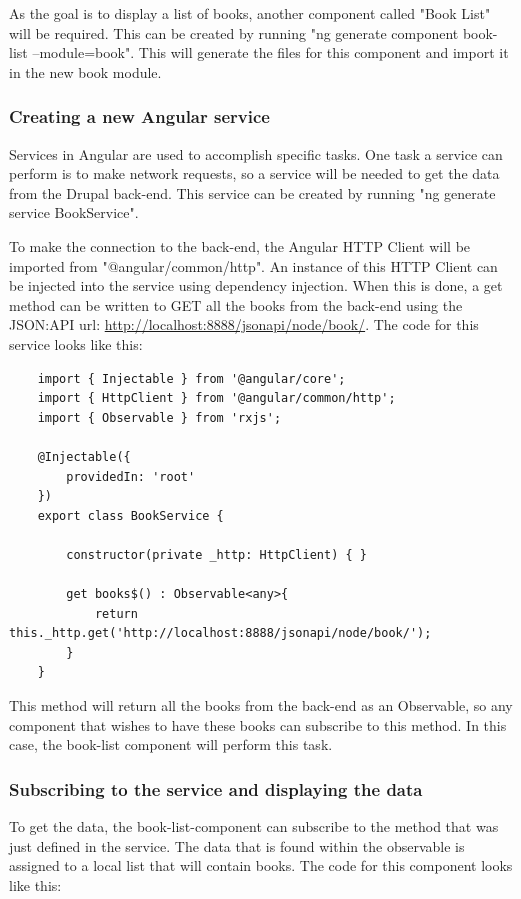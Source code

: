 As the goal is to display a list of books, another component called "Book List" will be required. This can be created by running "ng generate component book-list --module=book". This will generate the files for this component and import it in the new book module. 

\subsubsection{Creating a new Angular service}

Services in Angular are used to accomplish specific tasks. One task a service can perform is to make network requests, so a service will be needed to get the data from the Drupal back-end. This service can be created by running "ng generate service BookService".

To make the connection to the back-end, the Angular HTTP Client will be imported from "@angular/common/http". An instance of this HTTP Client can be injected into the service using dependency injection. When this is done, a get method can be written to GET all the books from the back-end using the JSON:API url: \url{http://localhost:8888/jsonapi/node/book/}. The code for this service looks like this: 


\begin{lstlisting}
	import { Injectable } from '@angular/core';
	import { HttpClient } from '@angular/common/http';
	import { Observable } from 'rxjs';
	
	@Injectable({
		providedIn: 'root'
	})
	export class BookService {
		
		constructor(private _http: HttpClient) { }
		
		get books$() : Observable<any>{
			return this._http.get('http://localhost:8888/jsonapi/node/book/');
		}
	}
\end{lstlisting}

This method will return all the books from the back-end as an Observable, so any component that wishes to have these books can subscribe to this method. In this case, the book-list component will perform this task.

\subsubsection{Subscribing to the service and displaying the data}

To get the data, the book-list-component can subscribe to the method that was just defined in the service. The data that is found within the observable is assigned to a local list that will contain books. The code for this component looks like this:

